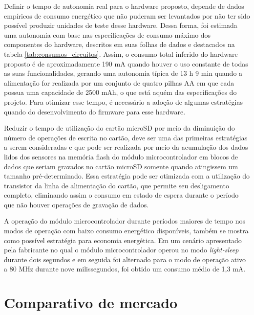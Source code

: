 
Definir o tempo de autonomia real para o hardware proposto, depende de dados empíricos de consumo energético que não puderam ser levantados por não ter sido possível produzir unidades de teste desse hardware. Dessa forma, foi estimada uma autonomia com base nas especificações de consumo máximo dos componentes do hardware, descritos em suas folhas de dados e destacados na tabela \ref{tab:consumos_circuitos}. Assim, o consumo total inferido do hardware proposto é de aproximadamente 190 mA quando houver o uso constante de todas as suas funcionalidades, gerando uma autonomia típica de 13 h 9 min quando a alimentação for realizada por um conjunto de quatro pilhas AA em que cada possua uma capacidade de 2500 mAh, o que está aquém das especificações do projeto. Para otimizar esse tempo, é necessário a adoção de algumas estratégias quando do desenvolvimento do firmware para esse hardware.

Reduzir o tempo de utilização do cartão microSD por meio da diminuição do número de operações de escrita no cartão, deve ser uma das primeiras estratégias a serem consideradas e que pode ser realizada por meio da acumulação dos dados lidos dos sensores na memória flash do módulo microcontrolador em blocos de dados que seriam gravados no cartão microSD somente quando atingissem um tamanho pré-determinado. Essa estratégia pode ser otimizada com a utilização do transistor da linha de alimentação do cartão, que permite seu desligamento completo, eliminando assim o consumo em estado de espera durante o período que não houver operações de gravação de dados. 

A operação do módulo microcontrolador durante períodos maiores de tempo nos modos de operação com baixo consumo energético disponíveis, também se mostra como possível estratégia para economia energética. Em um cenário apresentado pela fabricante  no qual o módulo microcontrolador operou no modo \textit{light-sleep} durante dois segundos e em seguida foi alternado para o modo de operação ativo a 80 MHz durante nove milissegundos, foi obtido um consumo médio de 1,3 mA.


\section{Comparativo de mercado}

